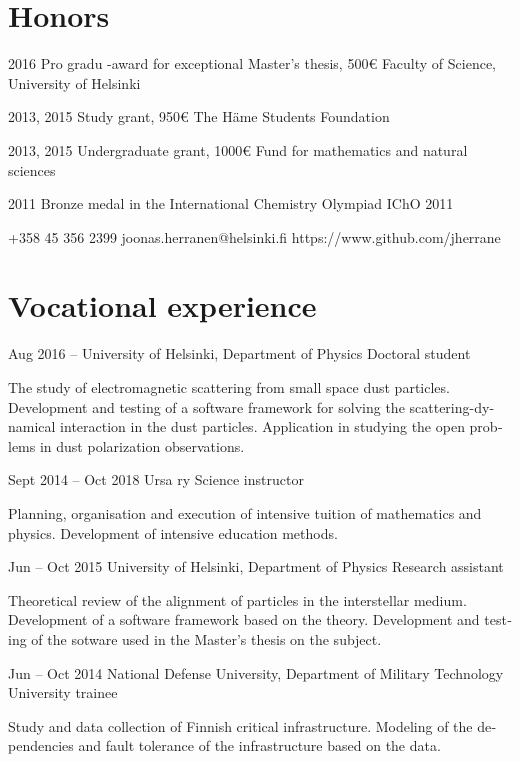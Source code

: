 \documentclass{tccv}
\begin{document}
\begin{otherlanguage}{english}
\section{Honors}
\begin{yearlist}
	\item{2016}
	{Pro gradu -award for exceptional Master's thesis, 500€}
	{Faculty of Science, University of Helsinki}
	\item{2013, 2015}
	{Study grant, 950€}
	{The Häme Students Foundation}	
	\item{2013, 2015}
	{Undergraduate grant, 1000€}
	{Fund for mathematics and natural sciences}	
	\item{2011}
	{Bronze medal in the International Chemistry Olympiad}
	{IChO 2011}	
\end{yearlist}

{+358 45 356 2399}
{joonas.herranen@helsinki.fi}
{https://www.github.com/jherrane}

\section{Vocational experience}
\begin{eventlist}	
	\item{Aug 2016 -- }
	{University of Helsinki, Department of Physics}
	{Doctoral student}
	
	The study of electromagnetic scattering from small space dust particles. Development and testing of a software framework for solving the scattering-dynamical interaction in the dust particles. Application in studying the open problems in dust polarization observations.
	
	\item{Sept 2014 -- Oct 2018}
	{Ursa ry}
	{Science instructor}
	
	Planning, organisation and execution of intensive tuition of mathematics and physics. Development of intensive education methods.
	
	\item{Jun -- Oct 2015}
	{University of Helsinki, Department of Physics}
	{Research assistant}
	
	Theoretical review of the alignment of particles in the interstellar medium. Development of a software framework based on the theory. Development and testing of the sotware used in the Master's thesis on the subject.
	
	\item{Jun -- Oct 2014}
	{National Defense University, \hspace*{2in} \linebreak
	Department of Military Technology}
	{University trainee}
	
	Study and data collection of Finnish critical infrastructure. Modeling of the dependencies and fault tolerance of the infrastructure based on the data.
	
\end{eventlist}
\end{otherlanguage}
\end{document}
